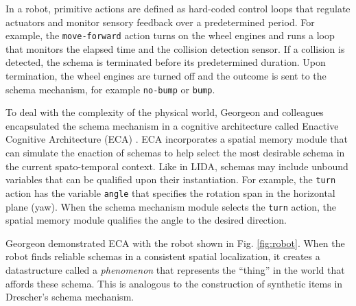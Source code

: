 \documentclass[runningheads]{llncs}
\begin{document}
In a robot, primitive actions are defined as hard-coded control loops that regulate actuators and monitor sensory feedback over a predetermined period. 
For example, the \texttt{move-forward} action turns on the wheel engines and runs a loop that monitors the elapsed time and the collision detection sensor. 
If a collision is detected, the schema is terminated before its predetermined duration. 
Upon termination, the wheel engines are turned off and the outcome is sent to the schema mechanism, for example \texttt{no-bump} or \texttt{bump}.

To deal with the complexity of the physical world, Georgeon and colleagues encapsulated the schema mechanism in a cognitive architecture called Enactive Cognitive Architecture (ECA) \cite{georgeon_eca_2013}.
ECA incorporates a spatial memory module that can simulate the enaction of schemas to help select the most desirable schema in the current spato-temporal context. 
Like in LIDA, schemas may include unbound variables that can be qualified upon their instantiation. 
For example, the \texttt{turn} action has the variable \texttt{angle} that specifies the rotation span in the horizontal plane (yaw).
When the schema mechanism module selects the \texttt{turn} action, the spatial memory module qualifies the angle to the desired direction.

Georgeon \cite{georgeon_artificial_2024} demonstrated ECA with the robot shown in Fig. \ref{fig:robot}.
When the robot finds reliable schemas in a consistent spatial localization, it creates a datastructure called a \textit{phenomenon} that represents the ``thing'' in the world that affords these schema.
This is analogous to the construction of synthetic items in Drescher's schema mechanism.
\end{document}
